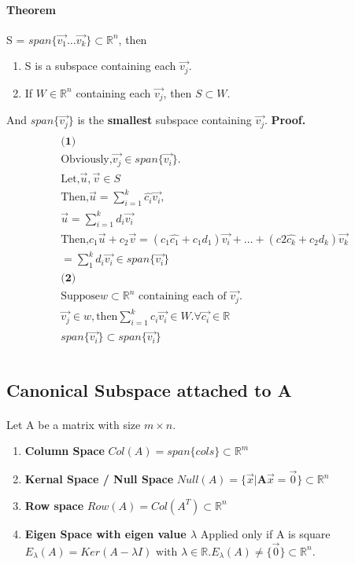 \documentclass{article}
\begin{document}
	\paragraph{Theorem} S = $span\{\vec{v_1}\ldots\vec{v_k}\} \subset \mathbb{R}^n$, then
	\begin{enumerate}
		\item S is a subspace containing each $\vec{v_j}$.
		\item If $W \in \mathbb{R}^n$ containing each $\vec{v_j}$, then $S \subset W$.
	\end{enumerate}
	And $span\{\vec{v_j}\}$ is the \textbf{smallest} subspace containing $\vec{v_j}$.
	\newline \textbf{Proof.}
	\begin{multline}
		\\
		\textbf{(1)} \\
		\text{Obviously,} \vec{v_j} \in span\{\vec{v_i}\}. \\
		\text{Let,} \vec{u}, \vec{v} \in S \\
		\text{Then,} \vec{u} = \sum_{i=1}^{k}\hat{c_i}\vec{v_i}, \\
		\vec{u} = \sum_{i=1}^{k}d_i\vec{v_i} \\
		\text{Then,} c_1 \vec{u} + c_2 \vec{v} = (c_1\hat{c_1} + c_1 d_1)\vec{v_i} + \ldots + (c2\hat{c_k} + c_2 d_k) \vec{v_k} \\
		= \sum_{1}^{k}d_i\vec{v_i} \in span\{\vec{v_i}\} \\
		\textbf{(2)} \\
		\text{Suppose} w \subset \mathbb{R} ^ n \text{ containing each of }\vec{v_j}. \\
		\vec{v_j} \in w, \text{then}
		\sum_{i=1}^{k}c_i \vec{v_i} \in W. \forall \vec{c_i} \in \mathbb{R} \\
		span\{\vec{v_i}\} \subset span\{\vec{v_i}\} \\
		\\
	\end{multline}
	\subsection{Canonical Subspace attached to A}
	\paragraph{} Let A be a matrix with size $m \times n$.
	\begin{enumerate}
		\item \textbf{Column Space} $Col(A) = span\{cols\} \subset \mathbb{R} ^ m$
		\item \textbf{Kernal Space / Null Space} $Null(A) = \{\vec{x} \vert \textbf{A}\vec{x} = \vec{0}\} \subset \mathbb{R} ^ n$
		\item \textbf{Row space} $Row(A) = Col(A^T) \subset \mathbb{R} ^ n$
		\item \textbf{Eigen Space with eigen value $\lambda$} Applied only if A is square $E_{\lambda}(A) = Ker(A - \lambda I) \text{ with } \lambda \in \mathbb{R}.E_{\lambda}(A) \neq \{\vec{0}\} \subset \mathbb{R} ^ n.$
	\end{enumerate}
\end{document}
